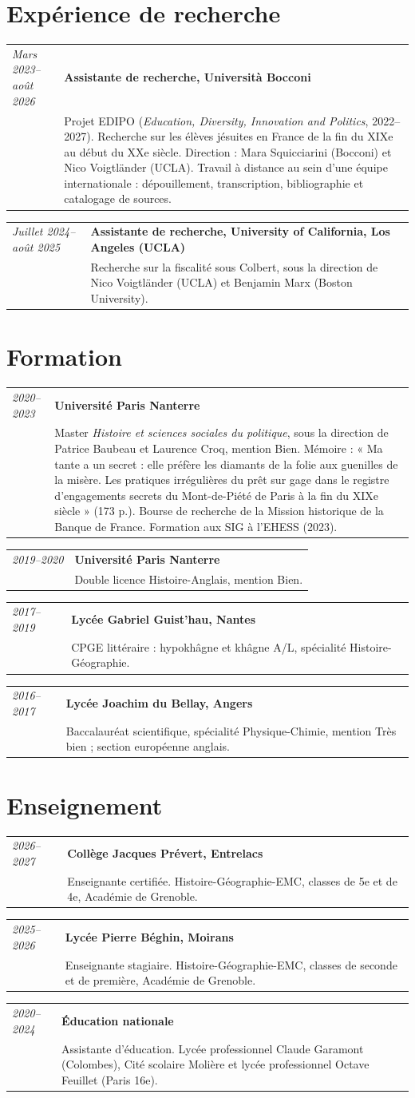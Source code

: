 \documentclass[11pt,a4paper]{article}
\makeatletter
\newcommand{\entry}[3]{\noindent\begin{tabularx}{\textwidth}{@{}>{\raggedright\arraybackslash}p{2.65cm}X@{}}\textit{#1}&\textbf{#2}\\& #3\end{tabularx}\par\vspace{3pt}}
\makeatother
\begin{document}
\section{Expérience de recherche}
\entry{Mars 2023--août 2026}{Assistante de recherche, Università Bocconi}{Projet EDIPO (\textit{Education, Diversity, Innovation and Politics}, 2022--2027). Recherche sur les élèves jésuites en France de la fin du XIXe au début du XXe siècle. Direction : Mara Squicciarini (Bocconi) et Nico Voigtländer (UCLA). Travail à distance au sein d’une équipe internationale : dépouillement, transcription, bibliographie et catalogage de sources.}
\entry{Juillet 2024--août 2025}{Assistante de recherche, University of California, Los Angeles (UCLA)}{Recherche sur la fiscalité sous Colbert, sous la direction de Nico Voigtländer (UCLA) et Benjamin Marx (Boston University).}

\newpage
\section{Formation}
\entry{2020--2023}{Université Paris Nanterre}{Master \textit{Histoire et sciences sociales du politique}, sous la direction de Patrice Baubeau et Laurence Croq, mention Bien. Mémoire : « Ma tante a un secret : elle préfère les diamants de la folie aux guenilles de la misère. Les pratiques irrégulières du prêt sur gage dans le registre d’engagements secrets du Mont-de-Piété de Paris à la fin du XIXe siècle » (173 p.). Bourse de recherche de la Mission historique de la Banque de France. Formation aux SIG à l’EHESS (2023).}
\entry{2019--2020}{Université Paris Nanterre}{Double licence Histoire-Anglais, mention Bien.}
\entry{2017--2019}{Lycée Gabriel Guist’hau, Nantes}{CPGE littéraire : hypokhâgne et khâgne A/L, spécialité Histoire-Géographie.}
\entry{2016--2017}{Lycée Joachim du Bellay, Angers}{Baccalauréat scientifique, spécialité Physique-Chimie, mention Très bien ; section européenne anglais.}

\section{Enseignement}
\entry{2026--2027}{Collège Jacques Prévert, Entrelacs}{Enseignante certifiée. Histoire-Géographie-EMC, classes de 5e et de 4e, Académie de Grenoble.}
\entry{2025--2026}{Lycée Pierre Béghin, Moirans}{Enseignante stagiaire. Histoire-Géographie-EMC, classes de seconde et de première, Académie de Grenoble.}
\entry{2020--2024}{Éducation nationale}{Assistante d’éducation. Lycée professionnel Claude Garamont (Colombes), Cité scolaire Molière et lycée professionnel Octave Feuillet (Paris 16e).}
\end{document}
